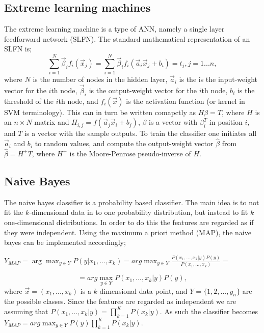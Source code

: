 \documentclass{article}
\begin{document}
\subsection{Extreme learning machines}
The extreme learning machine is a type of ANN, namely a single layer feedforward network (SLFN). The standard mathematical representation of an SLFN is;
\begin{equation}
\sum\limits_{i = 1}^N \vec{\beta}_i f_i (\vec{x}_j)  = \sum\limits_{i = 1}^N \vec{\beta}_i f_i (\vec{a}_i  \vec{x}_j + b_i)= t_j, j = 1...n, 
\end{equation}
where $N$ is the number of nodes in the hidden layer, $\vec{a}_i$ is the is the input-weight vector for the $i$th node, $\vec{\beta}_i$ is the output-weight vector for the $i$th node, $b_i$ is the threshold of the $i$th node, and $f_i(\vec{x})$ is the activation function (or kernel in SVM terminology). This can in turn be written comapctly as $H\beta = T$, where $H$ is an $n \times N$ matrix and $H_{i, j} = f(\vec{a}_j\vec{x}_i + b_j)$, $\beta$ is a vector with $\beta_i^T$ in position $i$, and $T$ is a vector with the sample outputs. To train the classifier one initiates all $\vec{a}_i$ and $b_i$ to random values, and compute the output-weight vector $\hat{\beta}$ from $\hat\beta = H^+ T$, where $H^+$ is the Moore-Penrose pseudo-inverse of $H$.

\subsection{Naive Bayes}
The naive bayes classifier is a probability based classifier. The main idea is to not fit the $k$-dimensional data in to one probability distribution, but instead to fit $k$ one-dimensional distributions. In order to do this the features are regarded as if they were independent. Using the maximum a priori method (MAP), the naive bayes can be implemented accordingly;
\begin{center}
$Y_{MAP} = \arg \max_{y \in Y} P(y | x_1, ..., x_k) = arg \max_{y \in Y} \frac{ P( x_1, ..., x_k | y)P(y) }{P(x_1, ..., x_k)}=$
\end{center}
\begin{equation}
 = arg \max_{y \in Y} P(x_1, ..., x_k|y)P(y) ,
\end{equation}
where $\vec{x} = (x_1, ..., x_k)$ is a $k$-dimensional data point, and $Y = \{1, 2, ...,y_n\}$ are the possible classes. Since the features are regarded as independent we are assuming that $P(x_1, ..., x_k| y) = \prod_{k=1}^{K} P(x_k |y).$ As such the classifier becomes $Y_{MAP} = arg \max_{y \in Y} P(y)\prod_{k=1}^{K}P(x_k|y)$.
\end{document}
